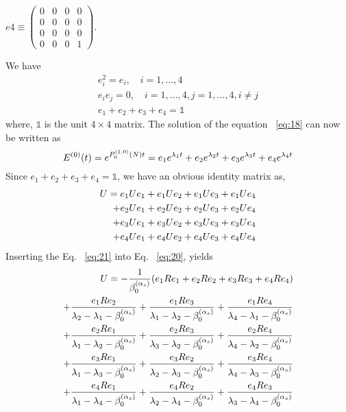 \documentclass[review]{elsarticle}
\begin{document}
\begin{center}
$e4\equiv\left(\begin{array}{cccc}
0 & 0 & 0 & 0\\
0 & 0 & 0 & 0\\
0 & 0 & 0 & 0\\
0 & 0 & 0 & 1
\end{array}\right)$.
\par\end{center}
We have
\begin{eqnarray}
e_{i}^{2}=e_{i},\quad i=1,\ldots,4 \nonumber\\
e_{i}e_{j}=0,\quad i=1,\ldots,4,j=1,\ldots,4,i\neq j \nonumber\\
e_{1}+e_{2}+e_{3}+e_{4}=\mathbb{1}
\end{eqnarray}
where, $\mathbb{1}$ is the unit $4\times4$ matrix.
The solution of the equation ~\eqref{eq:18} can
now be written as
\begin{equation}
E^{(0)}(t)=e^{P_{0}^{(1,0)}(N)t}=\\
e_{1}e^{\lambda_{1}t}+e_{2}e^{\lambda_{2}t}+e_{3}e^{\lambda_{3}t}+e_{4}e^{\lambda_{4}t}\label{eq:22}
\end{equation}
Since $e_{1}+e_{2}+e_{3}+e_{4}=\mathbb{1}$, we have an obvious identity matrix
as,
\begin{eqnarray}
U=e_{1}Ue_{1}+e_{1}Ue_{2}+e_{1}Ue_{3}+e_{1}Ue_{4}\cr
+e_{2}Ue_{1}+e_{2}Ue_{2}+e_{2}Ue_{3}+e_{2}Ue_{4}\cr
+e_{3}Ue_{1}+e_{3}Ue_{2}+e_{3}Ue_{3}+e_{3}Ue_{4}\cr
+ e_{4}Ue_{1}+e_{4}Ue_{2}+e_{4}Ue_{3}+e_{4}Ue_{4}\label{eq:23}
\end{eqnarray}
Inserting the Eq. ~\eqref{eq:21} into Eq. ~\eqref{eq:20}, yields
\begin{eqnarray}
U=-\frac{1}{\beta_{0}^{(\alpha_s)}}(e_{1}Re_{1}+e_{2}Re_{2}+e_{3}Re_{3}+e_{4}Re_{4})\cr
+\frac{e_{1}Re_{2}}{\lambda_{2}-\lambda_{1}-\beta_{0}^{(\alpha_s)}}+\frac{e_{1}Re_{3}}{\lambda_{1}-\lambda_{2}-\beta_{0}^{(\alpha_s)}}+\frac{e_{1}Re_{4}}{\lambda_{4}-\lambda_{1}-\beta_{0}^{(\alpha_s)}}\cr
+\frac{e_{2}Re_{1}}{\lambda_{1}-\lambda_{2}-\beta_{0}^{(\alpha_s)}}+\frac{e_{2}Re_{3}}{\lambda_{3}-\lambda_{2}-\beta_{0}^{(\alpha_s)}}+\frac{e_{2}Re_{4}}{\lambda_{4}-\lambda_{2}-\beta_{0}^{(\alpha_s)}}\cr
+\frac{e_{3}Re_{1}}{\lambda_{1}-\lambda_{3}-\beta_{0}^{(\alpha_s)}}+\frac{e_{3}Re_{2}}{\lambda_{2}-\lambda_{3}-\beta_{0}^{(\alpha_s)}}+\frac{e_{3}Re_{4}}{\lambda_{4}-\lambda_{3}-\beta_{0}^{(\alpha_s)}}\cr
+\frac{e_{4}Re_{1}}{\lambda_{1}-\lambda_{4}-\beta_{0}^{(\alpha_s)}}+\frac{e_{4}Re_{2}}{\lambda_{2}-\lambda_{4}-\beta_{0}^{(\alpha_s)}}+\frac{e_{4}Re_{3}}{\lambda_{3}-\lambda_{4}-\beta_{0}^{(\alpha_s)}}\label{eq:24}
\end{eqnarray}
\end{document}

